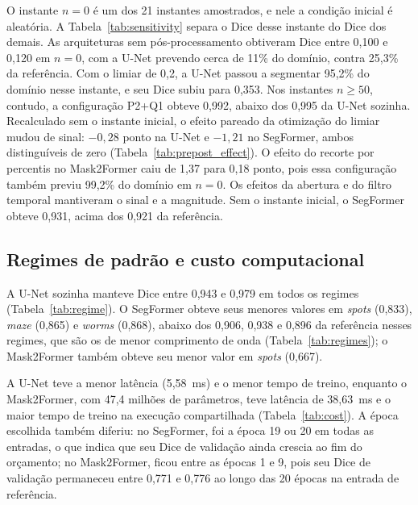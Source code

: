 \documentclass[final,5p,times,twocolumn]{elsarticle}
\begin{document}
O instante $n=0$ é um dos 21 instantes amostrados, e nele a condição inicial é aleatória. A Tabela~\ref{tab:sensitivity} separa o Dice desse instante do Dice dos demais. As arquiteturas sem pós-processamento obtiveram Dice entre 0,100 e 0,120 em $n=0$, com a U-Net prevendo cerca de 11\% do domínio, contra 25,3\% da referência. Com o limiar de 0,2, a U-Net passou a segmentar 95,2\% do domínio nesse instante, e seu Dice subiu para 0,353. Nos instantes $n\geq50$, contudo, a configuração P2+Q1 obteve 0,992, abaixo dos 0,995 da U-Net sozinha. Recalculado sem o instante inicial, o efeito pareado da otimização do limiar mudou de sinal: $-0,28$ ponto na U-Net e $-1,21$ no SegFormer, ambos distinguíveis de zero (Tabela~\ref{tab:prepost_effect}). O efeito do recorte por percentis no Mask2Former caiu de 1,37 para 0,18 ponto, pois essa configuração também previu 99,2\% do domínio em $n=0$. Os efeitos da abertura e do filtro temporal mantiveram o sinal e a magnitude. Sem o instante inicial, o SegFormer obteve 0,931, acima dos 0,921 da referência.



\subsection{Regimes de padrão e custo computacional}\label{subsec:regimes}

A U-Net sozinha manteve Dice entre 0,943 e 0,979 em todos os regimes (Tabela~\ref{tab:regime}). O SegFormer obteve seus menores valores em \textit{spots} (0,833), \textit{maze} (0,865) e \textit{worms} (0,868), abaixo dos 0,906, 0,938 e 0,896 da referência nesses regimes, que são os de menor comprimento de onda (Tabela~\ref{tab:regimes}); o Mask2Former também obteve seu menor valor em \textit{spots} (0,667).




A U-Net teve a menor latência (5,58~ms) e o menor tempo de treino, enquanto o Mask2Former, com 47,4 milhões de parâmetros, teve latência de 38,63~ms e o maior tempo de treino na execução compartilhada (Tabela~\ref{tab:cost}). A época escolhida também diferiu: no SegFormer, foi a época 19 ou 20 em todas as entradas, o que indica que seu Dice de validação ainda crescia ao fim do orçamento; no Mask2Former, ficou entre as épocas 1 e 9, pois seu Dice de validação permaneceu entre 0,771 e 0,776 ao longo das 20 épocas na entrada de referência.

\end{document}
